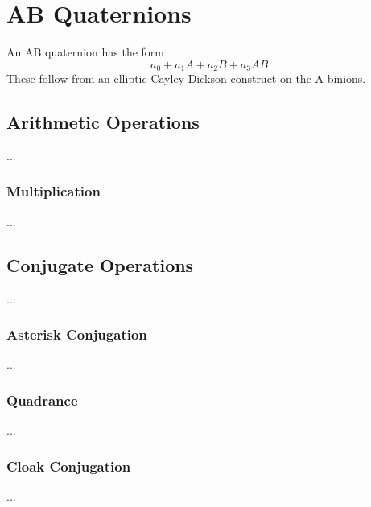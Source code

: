 \chapter{AB Quaternions}
An AB quaternion has the form
\begin{equation}
    a_{0} + a_{1} A + a_{2} B + a_{3} AB
\end{equation}
These follow from an elliptic Cayley-Dickson construct on the A binions.
\section{Arithmetic Operations}
...
\subsection{Multiplication}
...
\section{Conjugate Operations}
...
\subsection{Asterisk Conjugation}
...
\subsection{Quadrance}
...
\subsection{Cloak Conjugation}
...

